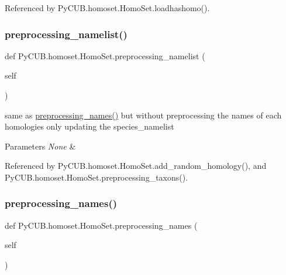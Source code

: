 Referenced by Py\+C\+U\+B.\+homoset.\+Homo\+Set.\+loadhashomo().

\mbox{\label{class_py_c_u_b_1_1homoset_1_1_homo_set_a4060c440127aa861c17b6157c81e2d27}} 
\subsubsection{\texorpdfstring{preprocessing\+\_\+namelist()}{preprocessing\_namelist()}}
{\footnotesize\ttfamily def Py\+C\+U\+B.\+homoset.\+Homo\+Set.\+preprocessing\+\_\+namelist (\begin{DoxyParamCaption}\item[{}]{self }\end{DoxyParamCaption})}



same as \mbox{\hyperlink{class_py_c_u_b_1_1homoset_1_1_homo_set_a36cf71a7bc24b788c4d526591a8ec376}{preprocessing\+\_\+names()}} but without preprocessing the names of each homologies only updating the species\+\_\+namelist 


\begin{DoxyParams}{Parameters}
{\em None} & \\
\hline
\end{DoxyParams}


Referenced by Py\+C\+U\+B.\+homoset.\+Homo\+Set.\+add\+\_\+random\+\_\+homology(), and Py\+C\+U\+B.\+homoset.\+Homo\+Set.\+preprocessing\+\_\+taxons().

\mbox{\label{class_py_c_u_b_1_1homoset_1_1_homo_set_a36cf71a7bc24b788c4d526591a8ec376}} 
\subsubsection{\texorpdfstring{preprocessing\+\_\+names()}{preprocessing\_names()}}
{\footnotesize\ttfamily def Py\+C\+U\+B.\+homoset.\+Homo\+Set.\+preprocessing\+\_\+names (\begin{DoxyParamCaption}\item[{}]{self }\end{DoxyParamCaption})}



